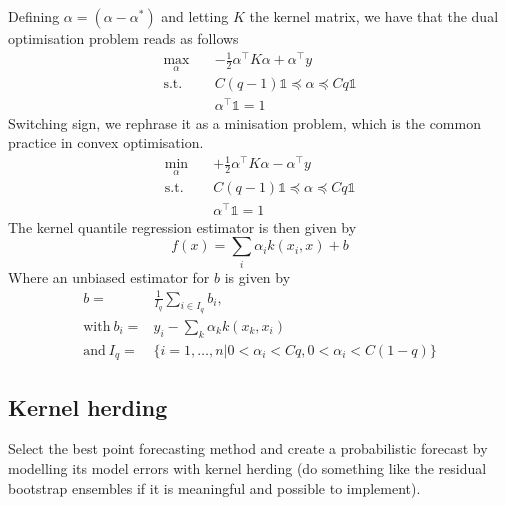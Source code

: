 Defining $\alpha=(\alpha-\alpha^*)$ and letting $K$ the kernel matrix, we have that the dual optimisation problem reads as follows
\begin{equation}\label{eq:kqr_min6}
    \begin{aligned}
        \max_{\alpha} \quad & -\frac{1}{2}\alpha^\intercal K\alpha+\alpha^\intercal y\\
    \textrm{s.t.} \quad & 
    C(q-1)\mathbb{1}\preceq \alpha \preceq Cq\mathbb{1}\\
    &\alpha^\intercal\mathbb{1}=1
    \end{aligned}
    \end{equation}
Switching sign, we rephrase it as a minisation problem, which is the common practice in convex optimisation.
\begin{equation}\label{eq:kqr_min7}
    \begin{aligned}
        \min_{\alpha} \quad & +\frac{1}{2}\alpha^\intercal K\alpha-\alpha^\intercal y\\
    \textrm{s.t.} \quad & 
    C(q-1)\mathbb{1}\preceq \alpha \preceq Cq\mathbb{1}\\
    &\alpha^\intercal\mathbb{1}=1
    \end{aligned}
    \end{equation}
The kernel quantile regression estimator is then given by
\begin{equation}
    f(x)=\sum\limits_i \alpha_i k(x_i, x)+b
\end{equation}
Where an unbiased estimator for $b$ is given by
\begin{equation}
    \begin{aligned}
    b=&\frac{1}{I_q}\sum\limits_{i\in I_q} b_i, \\ 
    \textrm{with} \ b_i=& y_i-\sum\limits_k \alpha_k k(x_k, x_i) \\
     \textrm{and} \ I_q=& \{i=1,\dots,n|0<\alpha_i<Cq, 0<\alpha_i<C(1-q)\}
    \end{aligned}
\end{equation}
\subsection{Kernel herding}
Select the best point forecasting method and create a probabilistic forecast by modelling its model errors with kernel herding (do something like the residual bootstrap ensembles if it is meaningful and possible to implement).